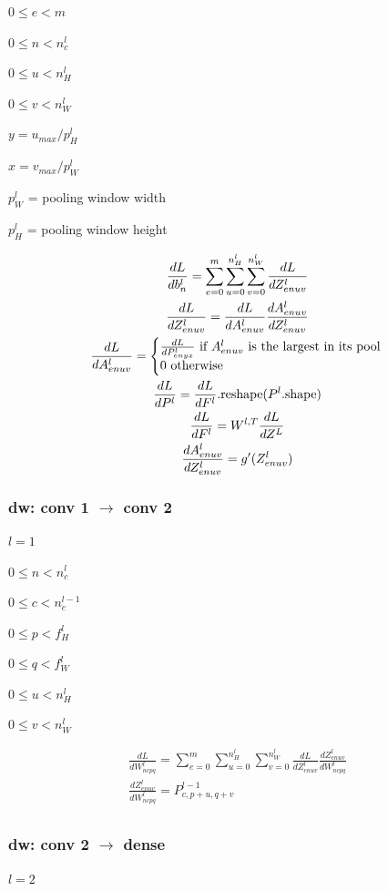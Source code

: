 \documentclass[12pt]{article}
\begin{document}
$0 \le e < m$

$0 \le n < n_c^l$

$0 \le u < n_H^l$

$0 \le v < n_W^l$

$y = u_{max}/p^l_H$

$x = v_{max}/p^l_W$

$p_W^l$ = pooling window width

$p_H^l$ = pooling window height

\begin{gather*}
    \frac{dL}{db^l_n} = \sum_{e=0}^m \sum_{u=0}^{n_H^l} \sum_{v=0}^{n_W^l} \frac{dL}{dZ^l_{enuv}}\\
    \frac{dL}{dZ^l_{enuv}} = \frac{dL}{dA^l_{enuv}} \frac{dA^l_{enuv}}{dZ^l_{enuv}}\\
    \frac{dL}{dA^l_{enuv}} = \left\{\begin{array}{@{}l@{}}
            \frac{dL}{dP^l_{enyx}} \text{ if $A^l_{enuv}$ is the largest in its pool}\\
            0 \text{ otherwise}
    \end{array}\right.\,\\
    \frac{dL}{dP^l} = \frac{dL}{dF^l}.\text{reshape}(P^l.\text{shape})\\
    \frac{dL}{dF^l} = W^{l,T} \frac{dL}{dZ^L}\\
    \frac{dA^l_{enuv}}{dZ^l_{enuv}} = g'(Z^l_{enuv})
\end{gather*}

\subsubsection{dw: conv 1 $\rightarrow$ conv 2}
$l = 1$

$0 \le n < n_c^l$

$0 \le c < n_c^{l-1}$

$0 \le p < f_H^l$

$0 \le q < f_W^l$

$0 \le u < n_H^l$

$0 \le v < n_W^l$

\begin{gather*}
    \frac{dL}{dW^l_{ncpq}} = \sum_{e=0}^m \sum_{u=0}^{n_H^l} \sum_{v=0}^{n_W^l} \frac{dL}{dZ^l_{enuv}}
    \frac{dZ^l_{enuv}}{dW^l_{ncpq}}\\
    \frac{dZ^l_{enuv}}{dW^l_{ncpq}} = P^{l-1}_{c,p+u,q+v}\\
\end{gather*}

\subsubsection{dw: conv 2 $\rightarrow$ dense}
$l = 2$
\end{document}
